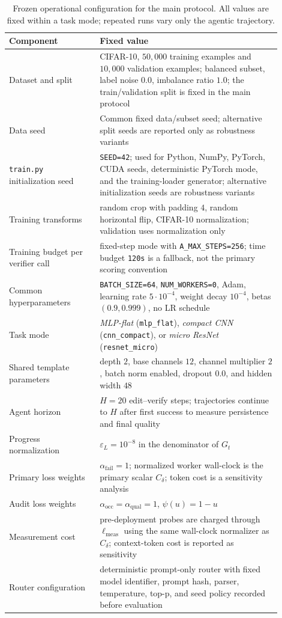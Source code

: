 \documentclass{article}
\newcommand{\eps}{\varepsilon}
\begin{document}
\begin{table}[t]
\centering
\small
\caption{Frozen operational configuration for the main protocol.
All values are fixed within a task mode; repeated runs vary only the agentic trajectory.}
\label{tab:train-config}
\begin{tabular}{@{}p{0.30\linewidth}p{0.60\linewidth}@{}}
\toprule
Component & Fixed value \\
\midrule
Dataset and split & CIFAR-10, $50{,}000$ training examples and $10{,}000$ validation examples; balanced subset, label noise $0.0$, imbalance ratio $1.0$; the train/validation split is fixed in the main protocol \\
Data seed & Common fixed data/subset seed; alternative split seeds are reported only as robustness variants \\
\texttt{train.py} initialization seed & \texttt{SEED=42}; used for Python, NumPy, PyTorch, CUDA seeds, deterministic PyTorch mode, and the training-loader generator; alternative initialization seeds are robustness variants \\
Training transforms & random crop with padding $4$, random horizontal flip, CIFAR-10 normalization; validation uses normalization only \\
Training budget per verifier call & fixed-step mode with \texttt{A\_MAX\_STEPS=256}; time budget \texttt{120s} is a fallback, not the primary scoring convention \\
Common hyperparameters & \texttt{BATCH\_SIZE=64}, \texttt{NUM\_WORKERS=0}, Adam, learning rate $5\cdot 10^{-4}$, weight decay $10^{-4}$, betas $(0.9,0.999)$, no LR schedule \\
Task mode & \textit{MLP-flat} (\texttt{mlp\_flat}), \textit{compact CNN} (\texttt{cnn\_compact}), or \textit{micro ResNet} (\texttt{resnet\_micro}) \\
Shared template parameters & depth $2$, base channels $12$, channel multiplier $2$, batch norm enabled, dropout $0.0$, and hidden width $48$ \\
Agent horizon & $H=20$ edit--verify steps; trajectories continue to $H$ after first success to measure persistence and final quality \\
Progress normalization & $\eps_L=10^{-8}$ in the denominator of $G_t$ \\
Primary loss weights & $\alpha_{\mathrm{fail}}=1$; normalized worker wall-clock is the primary scalar $C_\delta$; token cost is a sensitivity analysis \\
Audit loss weights & $\alpha_{\mathrm{occ}}=\alpha_{\mathrm{qual}}=1$, $\psi(u)=1-u$ \\
Measurement cost & pre-deployment probes are charged through $\ell_{\mathrm{meas}}$ using the same wall-clock normalizer as $C_\delta$; context-token cost is reported as sensitivity \\
Router configuration & deterministic prompt-only router with fixed model identifier, prompt hash, parser, temperature, top-p, and seed policy recorded before evaluation \\
\bottomrule
\end{tabular}
\end{table}
\end{document}
